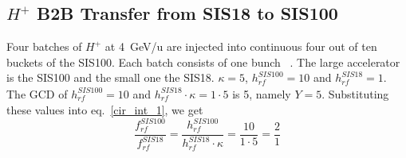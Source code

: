 %
%
%
\subsection{$H^{+}$ B2B Transfer from SIS18 to SIS100}
\label{sec:cir_no_int1}
Four batches of $H^{+}$ at \SI{4}{GeV/\atomicmassunit} are injected into continuous four out of ten buckets of the SIS100. Each batch consists of one bunch ~\cite{liebermann_fair_2013, liebermann_sis100_2013}. The large accelerator is the SIS100 and the small one the SIS18. $\kappa=5$, $h^{\mathit{SIS100}}_\mathit{rf}=10$ and $h^{\mathit{SIS18}}_\mathit{rf}=1$. The GCD of $h^{\mathit{SIS100}}_\mathit{rf}=10$ and $h^{\mathit{SIS18}}_\mathit{rf} \cdot \kappa=1\cdot 5$ is 5, namely $Y=5$. Substituting these values into eq.~\ref{cir_int_1}, we get
\begin{equation}
\frac{f_{\mathit{rf}}^{\mathit{SIS100}}}{f_{\mathit{rf}}^{\mathit{SIS18}}}= \frac {h^{\mathit{SIS100}}_\mathit{rf}}{h^{\mathit{SIS18}}_\mathit{rf} \cdot \kappa}= \frac{10}{1 \cdot 5}=\frac{2}{1}
\end{equation}

